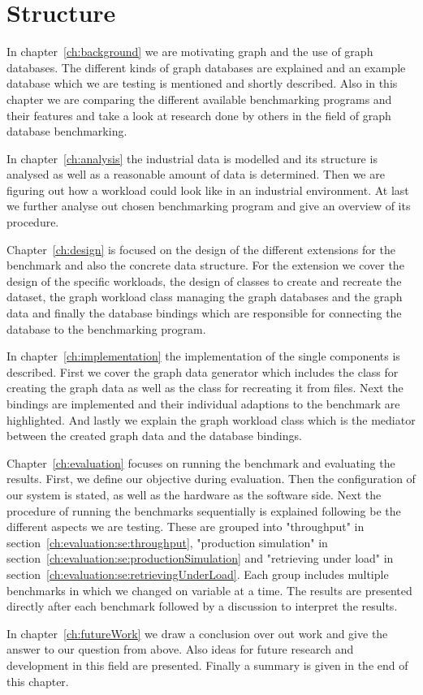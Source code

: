 \section{Structure}
In chapter~\ref{ch:background} we are motivating graph and the use of graph databases.
The different kinds of graph databases are explained and an example database which we are testing is mentioned and shortly described.
Also in this chapter we are comparing the different available benchmarking programs and their features and take a look at research done by others in the field of graph database benchmarking.

In chapter~\ref{ch:analysis} the industrial data is modelled and its structure is analysed as well as a reasonable amount of data is determined.
Then we are figuring out how a workload could look like in an industrial environment.
At last we further analyse out chosen benchmarking program and give an overview of its procedure.

Chapter~\ref{ch:design} is focused on the design of the different extensions for the benchmark and also the concrete data structure.
For the extension we cover the design of the specific workloads,
the design of classes to create and recreate the dataset,
the graph workload class managing the graph databases and the graph data and finally the database bindings which are responsible for connecting the database to the benchmarking program.

In chapter~\ref{ch:implementation} the implementation of the single components is described.
First we cover the graph data generator which includes the class for creating the graph data as well as the class for recreating it from files.
Next the bindings are implemented and their individual adaptions to the benchmark are highlighted.
And lastly we explain the graph workload class which is the mediator between the created graph data and the database bindings.

Chapter~\ref{ch:evaluation} focuses on running the benchmark and evaluating the results.
First, we define our objective during evaluation.
Then the configuration of our system is stated, as well as the hardware as the software side.
Next the procedure of running the benchmarks sequentially is explained following be the different aspects we are testing.
These are grouped into "throughput" in section~\ref{ch:evaluation:se:throughput}, "production simulation" in section~\ref{ch:evaluation:se:productionSimulation} and "retrieving under load" in section~\ref{ch:evaluation:se:retrievingUnderLoad}.
Each group includes multiple benchmarks in which we changed on variable at a time.
The results are presented directly after each benchmark followed by a discussion to interpret the results.

In chapter~\ref{ch:futureWork} we draw a conclusion over out work and give the answer to our question from above.
Also ideas for future research and development in this field are presented.
Finally a summary is given in the end of this chapter.
